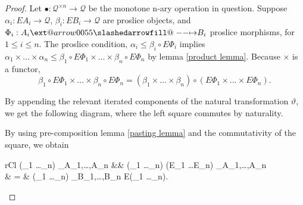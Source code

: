\documentclass[12pt]{article}
\makeatletter
\theoremstyle{definition}
\theoremstyle{plain}
\theoremstyle{plain}
\theoremstyle{plain}
\theoremstyle{plain}
\theoremstyle{remark}
\theoremstyle{remark}
\newcommand{\mc}[1]{\mathcal{#1}}
\def\slashedarrowfill@#1#2#3#4#5{%
	$\m@th\thickmuskip0mu\medmuskip\thickmuskip\thinmuskip\thickmuskip
	\relax#5#1\mkern-7mu%
	\cleaders\hbox{$#5\mkern-2mu#2\mkern-2mu$}\hfill
	\mathclap{#3}\mathclap{#2}%
	\cleaders\hbox{$#5\mkern-2mu#2\mkern-2mu$}\hfill
	\mkern-7mu#4$%
}
\def\rightslashedarrowfill@{%
	\slashedarrowfill@\relbar\relbar\mapstochar\rightarrow}
\newcommand\xslashedrightarrow[2][]{%
	\ext@arrow 0055{\rightslashedarrowfill@}{#1}{#2}}
\makeatother
\begin{document}
\begin{proof}
	Let $\bullet: \mc{Q}^{\times n} \rightarrow \mc{Q}$ be the monotone n-ary operation in question. Suppose $\alpha_i: EA_i \rightarrow \mc{Q}$,  $\beta_i: EB_i \rightarrow \mc{Q}$ are proslice objects, and $\Phi_i: A_i \xslashedrightarrow{} B_i$ proslice morphisms, for $1 \leq i \leq n$. The proslice condition, $\alpha_i \leq \beta_i \circ E\Phi_i$ implies $\alpha_1 \times \ldots \times \alpha_n \leq \beta_1 \circ E \Phi_1 \times \ldots \times \beta_n \circ E \Phi_n$ by lemma \ref{product lemma}. Because $\times$ is a functor, \[ \beta_1 \circ E \Phi_1 \times \ldots \times \beta_n \circ E \Phi_n =  (\beta_1 \times \ldots \times \beta_n) \circ (E\Phi_1 \times \ldots \times E\Phi_n). \] 
	
	By appending the relevant iterated components of the natural transformation $\vartheta$, we get the following diagram, where the left square commutes by naturality.
	\begin{center}
	\end{center}
	By using pre-composition lemma \ref{pasting lemma} and the commutativity of the square, we obtain
	\begin{IEEEeqnarray*}{rCl}
		(\alpha_1 \times \ldots \times \alpha_n) \circ \vartheta_{A_1,\ldots,A_n} &\leq& (\beta_1 \times \ldots \times \beta_n) \circ (E\Phi_1 \times \ldots \times E\Phi_n) \circ \vartheta_{A_1,\ldots,A_n} \\
			& = & (\beta_1 \times \ldots \times \beta_n) \circ \vartheta_{B_1,\ldots,B_n} \circ E(\Phi_1 \times \ldots \times \Phi_n).

\end{IEEEeqnarray*}
\end{proof}
\end{document}
